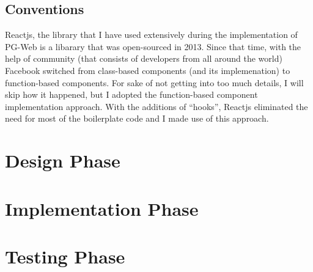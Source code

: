 \subsection{Conventions}

Reactjs, the library that I have used extensively during the implementation 
of PG-Web is a libarary that was open-sourced in 2013. Since that time, 
with the help of community (that consists of developers from all around the 
world) Facebook switched from class-based components (and its implemenation) 
to function-based components. For sake of not getting into too much details, 
I will skip how it happened, but I adopted the function-based component 
implementation approach. With the additions of ``hooks'', Reactjs eliminated 
the need for most of the boilerplate code and I made use of this approach.

\section{Design Phase}
\section{Implementation Phase}
\section{Testing Phase}